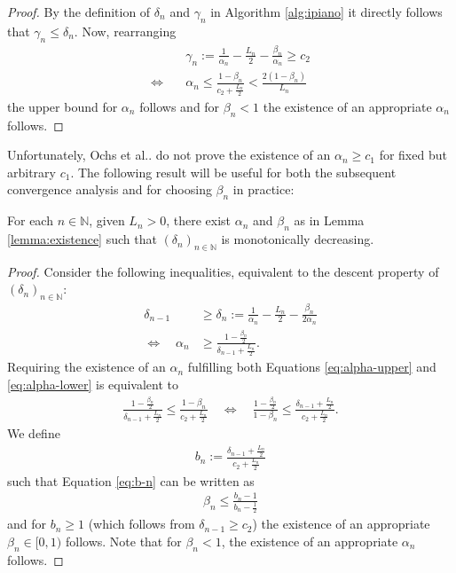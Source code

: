 \documentclass[onecolumn,final,a4paper,13pt,reqno]{siamart}
\makeatletter
\DeclareRobustCommand\onedot{\futurelet\@let@token\@onedot}
\def\@onedot{\ifx\@let@token.\else.\null\fi\xspace}
\def\etal{{et al}\onedot}
\makeatother
\begin{document}
\begin{proof}
	By the definition of $\delta_n$ and $\gamma_n$ in Algorithm \ref{alg:ipiano} it directly follows that $\gamma_n \leq \delta_n$. Now, rearranging
	\begin{align}
		&\gamma_n := \frac{1}{\alpha_n} - \frac{L_n}{2} - \frac{\beta_n}{\alpha_n} \geq c_2\\
		\Leftrightarrow\quad& \alpha_n \leq \frac{1 - \beta_n}{c_2 + \frac{L_n}{2}} < \frac{2(1 - \beta_n)}{L_n}\label{eq:alpha-upper}%
	\end{align}
	the upper bound for $\alpha_n$ follows and for $\beta_n < 1$ the existence of an appropriate $\alpha_n$ follows.
\end{proof}

Unfortunately, Ochs \etal do not prove the existence of an $\alpha_n \geq c_1$ for fixed but arbitrary $c_1$. The following result will be useful for both the subsequent convergence analysis and for choosing $\beta_n$ in practice:

\begin{lemmamd}
	For each $n \in \mathbb{N}$, given $L_n > 0$, there exist $\alpha_n$ and $\beta_n$ as in Lemma \ref{lemma:existence} such that $(\delta_n)_{n \in \mathbb{N}}$ is monotonically decreasing.\label{lemma:monotonicity}
\end{lemmamd}

\begin{proof}
	Consider the following inequalities, equivalent to the descent property of $(\delta_n)_{n \in \mathbb{N}}$:
	\begin{align}
		\delta_{n - 1} &\geq \delta_n := \frac{1}{\alpha_n} - \frac{L_n}{2} - \frac{\beta_n}{2\alpha_n}\\
		\Leftrightarrow\quad \alpha_n &\geq \frac{1 - \frac{\beta_n}{2}}{\delta_{n - 1} + \frac{L_n}{2}}.\label{eq:alpha-lower}
	\end{align}
	Requiring the existence of an $\alpha_n$ fulfilling both Equations \eqref{eq:alpha-upper} and \eqref{eq:alpha-lower} is equivalent to
	\begin{align}
		\frac{1 - \frac{\beta_n}{2}}{\delta_{n - 1} + \frac{L_n}{2}} \leq \frac{1 - \beta_n}{c_2 + \frac{L_n}{2}}\quad\Leftrightarrow\quad \frac{1 - \frac{\beta_n}{2}}{1 - \beta_n} \leq \frac{\delta_{n - 1} + \frac{L_n}{2}}{c_2 + \frac{L_n}{2}}.\label{eq:b-n}
	\end{align}
	We define
	\begin{align}
		b_n := \frac{\delta_{n - 1} + \frac{L_n}{2}}{c_2 + \frac{L_n}{2}}
	\end{align}
	such that Equation \eqref{eq:b-n} can be written as
	\begin{align}
		\beta_n \leq \frac{b_n - 1}{b_n - \frac{1}{2}}
	\end{align}
	and for $b_n \geq 1$ (which follows from $\delta_{n - 1} \geq c_2$) the existence of an appropriate $\beta_n \in [0,1)$ follows. Note that for $\beta_n < 1$, the existence of an appropriate $\alpha_n$ follows.
\end{proof}
\end{document}

